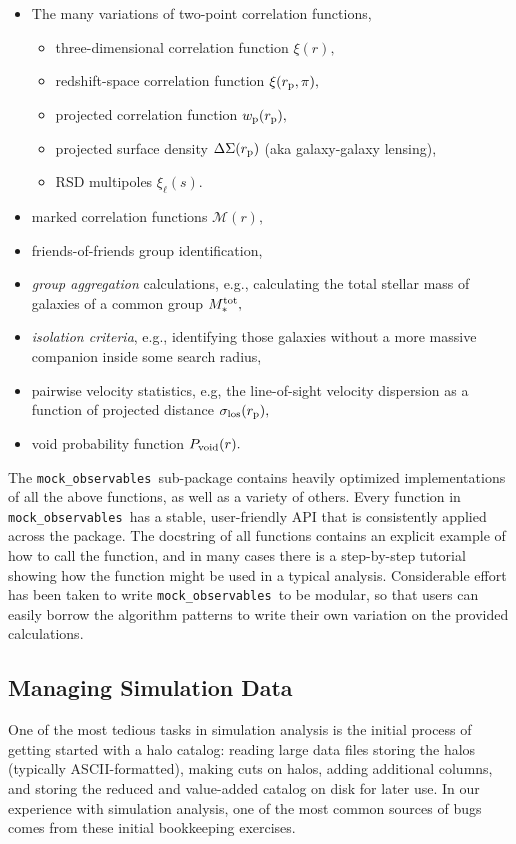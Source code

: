 \documentclass[usenatbib,usegraphicx,letterpaper]{mn2e}
\newcommand{\bit}{\begin{itemize}}
\newcommand{\eit}{\end{itemize}}
\newcommand{\rproj}{r_{\rm p}}
\newcommand{\mockobs}{{\tt mock\_observables }}
\begin{document}
\bit
\item The many variations of two-point correlation functions, 
\bit
\item three-dimensional correlation function $\xi(r),$ 
\item redshift-space correlation function $\xi(\rproj, \pi),$
\item projected correlation function $w_{\rm p}(\rproj),$
\item projected surface density $\Delta\Sigma(r_{\rm p})$ (aka galaxy-galaxy lensing),
\item RSD multipoles $\xi_{\ell}(s).$
\eit
\item marked correlation functions $\mathcal{M}(r),$
\item friends-of-friends group identification,
\item {\em group aggregation} calculations, e.g., calculating the total stellar mass of galaxies of a common group $M_{\ast}^{\rm tot},$
\item {\em isolation criteria}, e.g., identifying those galaxies without a more massive companion inside some search radius, 
\item pairwise velocity statistics, e.g, the line-of-sight velocity dispersion as a function of projected distance $\sigma_{\rm los}(\rproj),$
\item void probability function $P_{\rm void}(r).$
\eit

The \mockobs sub-package contains heavily optimized implementations of all the above functions, as well as a variety of others. Every function in \mockobs has a stable, user-friendly API that is consistently applied across the package. The docstring of all functions contains an explicit example of how to call the function, and in many cases there is a step-by-step tutorial showing how the function might be used in a typical analysis. Considerable effort has been taken to write \mockobs to be modular, so that users can easily borrow the algorithm patterns to write their own variation on the provided calculations. 

\subsection{Managing Simulation Data}
\label{subsection:sim_manager}

One of the most tedious tasks in simulation analysis is the initial process of getting started with a halo catalog: reading large data files storing the halos (typically ASCII-formatted), making cuts on halos, adding additional columns, and storing the reduced and value-added catalog on disk for later use. In our experience with simulation analysis, one of the most common sources of bugs comes from these initial bookkeeping exercises. 
\end{document}
